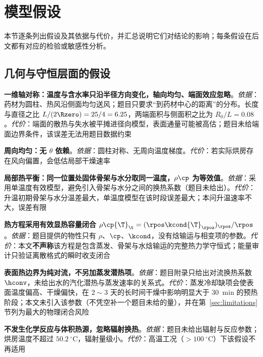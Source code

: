 \section{模型假设}
\label{sec:assumptions}

本节逐条列出假设及其依据与代价，并汇总说明它们对结论的影响；每条假设在后文都有对应的检验或敏感性分析。

\subsection{几何与守恒层面的假设}

\begin{assumptionlist}
\item[\textbf{A1}] \textbf{一维轴对称：温度与含水率只沿半径方向变化，轴向均匀、端面效应忽略}。\emph{依据}：药材为圆柱、热风沿侧面均匀送风；题目只要求``到药材中心的距离''的分布。长度与直径之比 $L/(2\Rzero)=25/4=6.25$，两端面积与侧面积之比为 $R_0/L=0.08$。\emph{代价}：端面的散热与失水被平摊进径向模型，表面通量可能被高估；题目未给端面边界条件，该误差无法用题目数据约束
\item[\textbf{A2}] \textbf{周向均匀：无 $\theta$ 依赖}。\emph{依据}：圆柱对称、无周向温度梯度。\emph{代价}：若实际烘房存在风向偏置，会低估局部干燥速率
\item[\textbf{A3}] \textbf{局部热平衡：同一位置处固体骨架与水分取同一温度，$\rho\cp$ 为等效值}。\emph{依据}：采用单温度有效模型，避免引入骨架与水分之间的换热系数（题目未给出）。\emph{代价}：升温初期骨架与水分温差最大，单温度模型在该时段误差最大；本问升温速率不大，误差有限
\item[\textbf{A4}] \textbf{热方程采用\textbf{有效显热容量}闭合 $\rho\cp{\T}_\t=(\rpos\kcond{\T}_\rpos)_\rpos/\rpos$}。\emph{依据}：题目提供的物性只有 $\rho$、$\cp$、$\kcond$，没有焓输运与相变项的参数。\emph{代价}：本文\textbf{不声称}该方程是包含蒸发、骨架与水焓输运的完整热力学守恒式；能量审计只验证离散格式的瞬时收支闭合
\item[\textbf{A5}] \textbf{表面热边界为\textbf{纯对流}，不另加蒸发潜热项}。\emph{依据}：题目附录只给出对流换热系数 $\hconv$，未给出水的汽化潜热与蒸发速率的关系式。\emph{代价}：蒸发冷却缺项会使表面温度偏高、干燥偏快，在 $2\sim3$ 天的长时间干燥中影响明显大于 $30$~min 的预热阶段；本文未引入该参数（不凭空补一个题目未给的量），并在第~\ref{sec:limitations} 节列为最大的物理闭合风险
\item[\textbf{A6}] \textbf{不发生化学反应与体积热源，忽略辐射换热}。\emph{依据}：题目未给出辐射与反应参数；烘房温度不超过 $50.2~^\circ$C，辐射量级小。\emph{代价}：高温工况（$>100~^\circ$C）下该假设不再适用
\end{assumptionlist}

